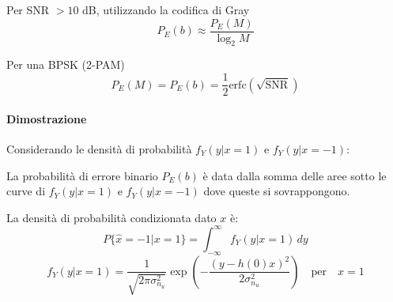 \begin{center}

\end{center}

Per SNR $> 10$ dB, utilizzando la codifica di Gray
\[
    P_E(b) \approx \frac{P_E(M)}{\log_2 M}
\]

Per una BPSK (2-PAM)
\[
    P_E(M) = P_E(b) = \frac{1}{2} \text{erfc}\left(\sqrt{\text{SNR}}\right)
\]

\paragraph{Dimostrazione}

Considerando le densità di probabilità $f_Y(y|x=1)$ e $f_Y(y|x=-1)$:

La probabilità di errore binario $P_E(b)$ è data dalla somma delle aree sotto le curve di $f_Y(y|x=1)$ e $f_Y(y|x=-1)$ dove queste si sovrappongono.



La densità di probabilità condizionata dato $x$ è:
\[
    P\{ \hat{x} = -1 | x = 1 \} = \int_{-\infty}^{\infty} f_Y(y | x = 1) \, dy
\]
\[
    f_Y(y | x = 1) = \frac{1}{\sqrt{2\pi \sigma_{n_u}^2}} \exp \left( -\frac{(y - h(0)x)^2}{2\sigma_{n_u}^2} \right) \quad \text{per} \quad x = 1
\]

